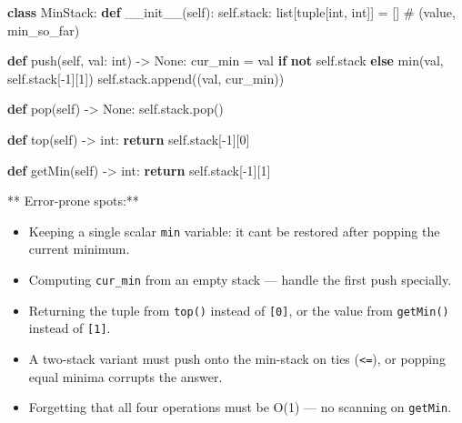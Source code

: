 \documentclass[11pt]{article}
\providecommand{\tightlist}{\setlength{\itemsep}{1pt}\setlength{\parskip}{0pt}}
\newenvironment{Shaded}{\begin{snugshade}}{\end{snugshade}}
\newcommand{\BuiltInTok}[1]{\textcolor[rgb]{0.50,0.55,0.55}{#1}}
\newcommand{\CommentTok}[1]{\textcolor[rgb]{0.48,0.49,0.49}{#1}}
\newcommand{\ControlFlowTok}[1]{\textcolor[rgb]{0.99,0.74,0.29}{\textbf{#1}}}
\newcommand{\DecValTok}[1]{\textcolor[rgb]{0.96,0.45,0.00}{#1}}
\newcommand{\FunctionTok}[1]{\textcolor[rgb]{0.56,0.27,0.68}{#1}}
\newcommand{\KeywordTok}[1]{\textcolor[rgb]{0.81,0.81,0.76}{\textbf{#1}}}
\newcommand{\NormalTok}[1]{\textcolor[rgb]{0.81,0.81,0.76}{#1}}
\newcommand{\OperatorTok}[1]{\textcolor[rgb]{0.81,0.81,0.76}{#1}}
\newcommand{\VariableTok}[1]{\textcolor[rgb]{0.15,0.68,0.68}{#1}}
\begin{document}
\begin{Shaded}
\begin{Highlighting}[]
\KeywordTok{class}\NormalTok{ MinStack:}
    \KeywordTok{def} \FunctionTok{\_\_init\_\_}\NormalTok{(}\VariableTok{self}\NormalTok{):}
        \VariableTok{self}\NormalTok{.stack: }\BuiltInTok{list}\NormalTok{[}\BuiltInTok{tuple}\NormalTok{[}\BuiltInTok{int}\NormalTok{, }\BuiltInTok{int}\NormalTok{]] }\OperatorTok{=}\NormalTok{ []   }\CommentTok{\# (value, min\_so\_far)}

    \KeywordTok{def}\NormalTok{ push(}\VariableTok{self}\NormalTok{, val: }\BuiltInTok{int}\NormalTok{) }\OperatorTok{{-}\textgreater{}} \VariableTok{None}\NormalTok{:}
\NormalTok{        cur\_min }\OperatorTok{=}\NormalTok{ val }\ControlFlowTok{if} \KeywordTok{not} \VariableTok{self}\NormalTok{.stack }\ControlFlowTok{else} \BuiltInTok{min}\NormalTok{(val, }\VariableTok{self}\NormalTok{.stack[}\OperatorTok{{-}}\DecValTok{1}\NormalTok{][}\DecValTok{1}\NormalTok{])}
        \VariableTok{self}\NormalTok{.stack.append((val, cur\_min))}

    \KeywordTok{def}\NormalTok{ pop(}\VariableTok{self}\NormalTok{) }\OperatorTok{{-}\textgreater{}} \VariableTok{None}\NormalTok{:}
        \VariableTok{self}\NormalTok{.stack.pop()}

    \KeywordTok{def}\NormalTok{ top(}\VariableTok{self}\NormalTok{) }\OperatorTok{{-}\textgreater{}} \BuiltInTok{int}\NormalTok{:}
        \ControlFlowTok{return} \VariableTok{self}\NormalTok{.stack[}\OperatorTok{{-}}\DecValTok{1}\NormalTok{][}\DecValTok{0}\NormalTok{]}

    \KeywordTok{def}\NormalTok{ getMin(}\VariableTok{self}\NormalTok{) }\OperatorTok{{-}\textgreater{}} \BuiltInTok{int}\NormalTok{:}
        \ControlFlowTok{return} \VariableTok{self}\NormalTok{.stack[}\OperatorTok{{-}}\DecValTok{1}\NormalTok{][}\DecValTok{1}\NormalTok{]}
\end{Highlighting}
\end{Shaded}

** Error-prone spots:**

\begin{itemize}
\tightlist
\item
  Keeping a single scalar \texttt{min} variable: it can\textquotesingle t be restored after popping the current minimum.
\item
  Computing \texttt{cur\_min} from an empty stack --- handle the first push specially.
\item
  Returning the tuple from \texttt{top()} instead of \texttt{{[}0{]}}, or the value from \texttt{getMin()} instead of \texttt{{[}1{]}}.
\item
  A two-stack variant must push onto the min-stack on ties (\texttt{\textless{}=}), or popping equal minima corrupts the answer.
\item
  Forgetting that all four operations must be O(1) --- no scanning on \texttt{getMin}.
\end{itemize}
\end{document}
